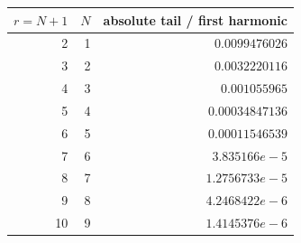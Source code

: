 \begin{tabular}{@{}rrr@{}}
\toprule
$r=N+1$ & $N$ & absolute tail / first harmonic\\
\midrule
2 & 1 & $0.0099476026$\\
3 & 2 & $0.0032220116$\\
4 & 3 & $0.001055965$\\
5 & 4 & $0.00034847136$\\
6 & 5 & $0.00011546539$\\
7 & 6 & $3.835166e-5$\\
8 & 7 & $1.2756733e-5$\\
9 & 8 & $4.2468422e-6$\\
10 & 9 & $1.4145376e-6$\\
\bottomrule
\end{tabular}
